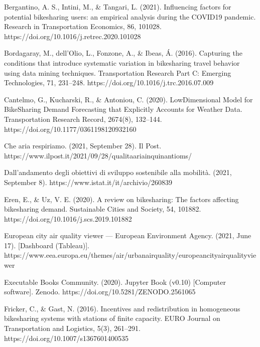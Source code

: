 \documentclass[letterpaper,10pt,english]{jupyterBook}
\begin{document}
\sphinxAtStartPar
Bergantino, A. S., Intini, M., \& Tangari, L. (2021). Influencing factors for potential bike\sphinxhyphen{}sharing users: an empirical analysis during the COVID\sphinxhyphen{}19 pandemic. Research in Transportation Economics, 86, 101028. https://doi.org/10.1016/j.retrec.2020.101028

\sphinxAtStartPar
Bordagaray, M., dell’Olio, L., Fonzone, A., \& Ibeas, Á. (2016). Capturing the conditions that introduce systematic variation in bike\sphinxhyphen{}sharing travel behavior using data mining techniques. Transportation Research Part C: Emerging Technologies, 71, 231–248. https://doi.org/10.1016/j.trc.2016.07.009

\sphinxAtStartPar
Cantelmo, G., Kucharski, R., \& Antoniou, C. (2020). Low\sphinxhyphen{}Dimensional Model for Bike\sphinxhyphen{}Sharing Demand Forecasting that Explicitly Accounts for Weather Data. Transportation Research Record, 2674(8), 132–144. https://doi.org/10.1177/0361198120932160

\sphinxAtStartPar
Che aria respiriamo. (2021, September 28). Il Post. https://www.ilpost.it/2021/09/28/qualita\sphinxhyphen{}aria\sphinxhyphen{}inquinanti\sphinxhyphen{}oms/

\sphinxAtStartPar
Dall’andamento degli obiettivi di sviluppo sostenibile alla mobilità. (2021, September 8). https://www.istat.it/it/archivio/260839

\sphinxAtStartPar
Eren, E., \& Uz, V. E. (2020). A review on bike\sphinxhyphen{}sharing: The factors affecting bike\sphinxhyphen{}sharing demand. Sustainable Cities and Society, 54, 101882. https://doi.org/10.1016/j.scs.2019.101882

\sphinxAtStartPar
European city air quality viewer — European Environment Agency. (2021, June 17). {[}Dashboard (Tableau){]}. https://www.eea.europa.eu/themes/air/urban\sphinxhyphen{}air\sphinxhyphen{}quality/european\sphinxhyphen{}city\sphinxhyphen{}air\sphinxhyphen{}quality\sphinxhyphen{}viewer

\sphinxAtStartPar
Executable Books Community. (2020). Jupyter Book (v0.10) {[}Computer software{]}. Zenodo. https://doi.org/10.5281/ZENODO.2561065

\sphinxAtStartPar
Fricker, C., \& Gast, N. (2016). Incentives and redistribution in homogeneous bike\sphinxhyphen{}sharing systems with stations of finite capacity. EURO Journal on Transportation and Logistics, 5(3), 261–291. https://doi.org/10.1007/s13676\sphinxhyphen{}014\sphinxhyphen{}0053\sphinxhyphen{}5
\end{document}
